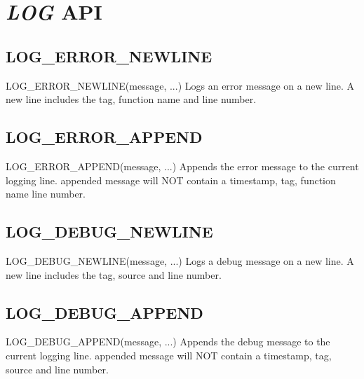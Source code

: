 \section{\textit{LOG} API}


\subsection{LOG\_ERROR\_NEWLINE}
\label{func:LOGERRORNEWLINE}
\begin{pdfunction}
{LOG\_ERROR\_NEWLINE(message, ...) }
{ 
Logs an error message on a new line. A new line includes the 
tag, function name and line number. }
\end{pdfunction}

\subsection{LOG\_ERROR\_APPEND}
\label{func:LOGERRORAPPEND}
\begin{pdfunction}
{LOG\_ERROR\_APPEND(message, ...) }
{ 
Appends the error message to the current logging line. 
appended message will NOT contain a timestamp, tag, function name 
line number. }
\end{pdfunction}

\subsection{LOG\_DEBUG\_NEWLINE}
\label{func:LOGDEBUGNEWLINE}
\begin{pdfunction}
{LOG\_DEBUG\_NEWLINE(message, ...) }
{ 
Logs a debug message on a new line. A new line includes the 
tag, source and line number. }
\end{pdfunction}

\subsection{LOG\_DEBUG\_APPEND}
\label{func:LOGDEBUGAPPEND}
\begin{pdfunction}
{LOG\_DEBUG\_APPEND(message, ...) }
{ 
Appends the debug message to the current logging line. 
appended message will NOT contain a timestamp, tag, source and line number. }
\end{pdfunction}
